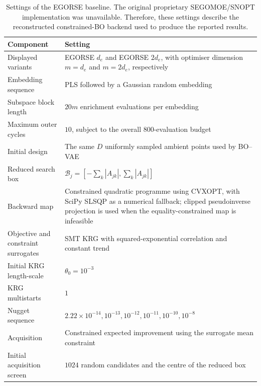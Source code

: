 \documentclass[pdflatex,sn-mathphys-num]{sn-jnl}%
\theoremstyle{thmstyleone}%
\theoremstyle{thmstyletwo}%
\theoremstyle{thmstylethree}%
\begin{document}
\begin{appendices}
\begin{table}[h]
\caption{Settings of the EGORSE baseline. The original proprietary SEGOMOE/SNOPT implementation was unavailable. Therefore, these settings describe the reconstructed constrained-BO backend used to produce the reported results.}
\label{tab:reconstructed-egorse-settings}
\centering
\small
\renewcommand{\arraystretch}{1.1}

\begin{tabularx}{\linewidth}{@{}l Y@{}}
\toprule
Component & Setting \\
\midrule
Displayed variants
& EGORSE $d_e$ and EGORSE $2d_e$, with optimiser dimension
  $m=d_e$ and $m=2d_e$, respectively \\

Embedding sequence
& PLS followed by a Gaussian random embedding \\

Subspace block length
& $20m$ enrichment evaluations per embedding \\

Maximum outer cycles
& $10$, subject to the overall $800$-evaluation budget \\

Initial design
& The same $D$ uniformly sampled ambient points used by BO--VAE \\

Reduced search box
& $\mathcal{B}_j=[-\sum_k|A_{jk}|,\sum_k|A_{jk}|]$ \\

Backward map
& Constrained quadratic programme using CVXOPT, with SciPy SLSQP
  as a numerical fallback; clipped pseudoinverse projection is used
  when the equality-constrained map is infeasible \\

Objective and constraint surrogates
& SMT KRG with squared-exponential correlation and constant trend \\

Initial KRG length-scale
& $\theta_0=10^{-3}$ \\

KRG multistarts
& $1$ \\

Nugget sequence
& $2.22\times10^{-14},10^{-13},10^{-12},10^{-11},
  10^{-10},10^{-8}$ \\

Acquisition
& Constrained expected improvement using the surrogate mean constraint \\

Initial acquisition screen
& $1024$ random candidates and the centre of the reduced box \\


\end{tabularx}
\end{table}
\end{appendices}
\end{document}
